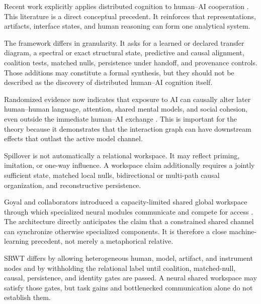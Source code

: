 
Recent work explicitly applies distributed cognition to human--AI cooperation
\cite{SidjiEtAl2024,ZhaoHan2026}. This literature is a direct conceptual
precedent. It reinforces that representations, artifacts, interface states,
and human reasoning can form one analytical system.

The framework differs in granularity. It asks for a learned or declared
transfer diagram, a spectral or exact structural state, predictive and causal
alignment, coalition tests, matched nulls, persistence under handoff, and
provenance controls. Those additions may constitute a formal synthesis, but
they should not be described as the discovery of distributed human--AI
cognition itself.


Randomized evidence now indicates that exposure to AI can causally alter later
human--human language, attention, shared mental models, and social cohesion,
even outside the immediate human--AI exchange \cite{RiedlEtAl2026}. This is
important for the theory because it demonstrates that the interaction graph can
have downstream effects that outlast the active model channel.

Spillover is not automatically a relational workspace. It may reflect
priming, imitation, or one-way influence. A workspace claim additionally
requires a jointly sufficient state, matched local nulls, bidirectional or
multi-path causal organization, and reconstructive persistence.


Goyal and collaborators introduced a capacity-limited shared global workspace
through which specialized neural modules communicate and compete for access
\cite{GoyalEtAl2022}. The architecture directly anticipates the claim that a
constrained shared channel can synchronize otherwise specialized components.
It is therefore a close machine-learning precedent, not merely a metaphorical
relative.

SRWT differs by allowing heterogeneous human, model, artifact, and instrument
nodes and by withholding the relational label until coalition, matched-null,
causal, persistence, and identity gates are passed. A neural shared workspace
may satisfy those gates, but task gains and bottlenecked communication alone do
not establish them.


